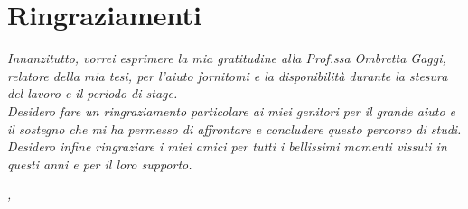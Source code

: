 
\cleardoublepage
{}
{}

%
%
\bigskip
\begingroup
\let\clearpage\relax
\let\cleardoublepage\relax
\let\cleardoublepage\relax

\chapter*{Ringraziamenti}

\noindent \textit{Innanzitutto, vorrei esprimere la mia gratitudine alla Prof.ssa Ombretta Gaggi, relatore della mia tesi, per l'aiuto fornitomi e la disponibilità durante la stesura del lavoro e il periodo di stage.}\\

\noindent \textit{Desidero fare un ringraziamento particolare ai miei genitori per il grande aiuto e il sostegno che mi ha permesso di affrontare e concludere questo percorso di studi.}\\

\noindent \textit{Desidero infine ringraziare i miei amici per tutti i bellissimi momenti vissuti in questi anni e per il loro supporto.}\\
\bigskip

\noindent\textit{\myLocation, \myTime}
\hfill \myName

\endgroup

